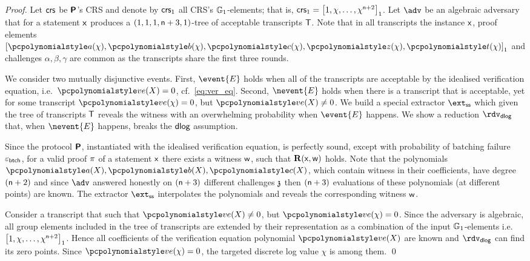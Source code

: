 \let\accentvec\vec \documentclass[runningheads,10pt]{llncs}
\begin{document}
\begin{proof}
	Let $\mathsf{crs}$ be $\bm{\mathsf{P}}$'s CRS and denote by $\mathsf{crs}_1$ all CRS's $\mathbb{G}_1$-elements; that is, $\mathsf{crs}_1 = \left[1, \chi, \ldots, \chi^{\mathsf{n} + 2}\right]_{1}$. 
	Let $\adv$ be an algebraic adversary that for a statement $\mathsf{x}$ produces a $(1, 1, 1, \mathsf{n} + 3, 1)$-tree of acceptable transcripts $\mathsf{T}$. %
	Note that in all transcripts the instance $\mathsf{x}$, proof elements $\gone{\p{a}(\chi), \p{b}(\chi), \p{c}(\chi), \p{z}(\chi), \p{t}(\chi)}$ and challenges $\alpha, \beta, \gamma$ are common as the transcripts share the first three rounds. 
	
	We consider two mutually disjunctive events. 
	First, $\event{E}$ holds when all of the transcripts are acceptable by the idealised verification equation, i.e.~$\vereq(X) = 0$, cf.~\cref{eq:ver_eq}.
	Second, $\nevent{E}$ holds when there is a transcript that is acceptable, yet 
	for some transcript $\vereq(\chi) = 0$, but $\vereq(X) \neq 0$.
	We build a special extractor $\extss$ which given the tree of transcripts $\mathsf{T}$ reveals the witness with an overwhelming probability when $\event{E}$ happens. 
	We show a reduction $\rdvdlog$ that, when $\nevent{E}$ happens, breaks the $\mathsf{dlog}$ assumption. 
	
	  Since the protocol $\bm{\mathsf{P}}$,
	instantiated with the idealised verification equation, is perfectly sound,
	except with probability of batching failure $\varepsilon_{\mathsf{btch}}$, for a valid proof
	$\pi$ of a statement $\mathsf{x}$ there exists a witness $\mathsf{w}$, such that
	$\mathbf{R}(\mathsf{x}, \mathsf{w})$ holds.  Note that the polynomials $\p{a}(X),
	\p{b}(X), \p{c}(X)$, which contain witness in their coefficients, have degree $(\mathsf{n} + 2)$ and since $\adv$
	answered honestly on $(\mathsf{n} + 3)$ different challenges $\mathfrak{z}$
	then $(\mathsf{n} + 3)$ evaluations of these polynomials (at
	different points) are known. The extractor $\extss$ interpolates the
	polynomials and reveals the corresponding witness $\mathsf{w}$.

	 Consider a transcript that such that
	$\vereq(X) \neq 0$, but $\vereq(\chi) = 0$.
	Since the adversary is algebraic, all group elements included in the tree of
  transcripts are extended by their representation as a combination of the input
  $\mathbb{G}_1$-elements i.e.~$\left[1, \chi, \ldots, \chi^{\mathsf{n} +
      2}\right]_{1}$. Hence all coefficients of the verification equation polynomial
  $\vereq(X)$ are known and $\rdvdlog$ can find its zero points. Since
  $\vereq(\chi) = 0$, the targeted discrete log value $\chi$ is among them.
	\qed
\end{proof}
\end{document}
